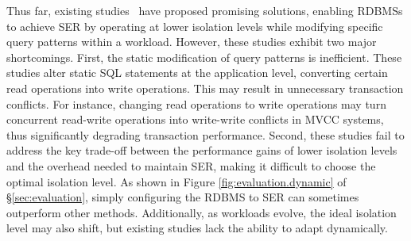 
Thus far, existing studies~\cite{DBLP:journals/pvldb/BailisFFGHS14, DBLP:conf/pods/Fekete19, DBLP:conf/sigmod/BailisFHGS14, DBLP:journals/pvldb/FeketeGA09, DBLP:journals/tods/CahillRF09}  
have proposed promising solutions, enabling RDBMSs to achieve SER by operating at lower isolation levels while modifying specific query patterns within a workload. However, these studies exhibit two major shortcomings. 
First, the static modification of query patterns is inefficient.
These studies alter static SQL statements at the application level, converting certain read operations into write operations. This may result in unnecessary transaction conflicts. For instance, changing read operations to write operations may turn concurrent read-write operations into write-write conflicts in MVCC systems, thus significantly degrading transaction performance.
Second, these studies fail to address the key trade-off between the performance gains of lower isolation levels and the overhead needed to maintain SER, making it difficult to choose the optimal isolation level.
As shown in Figure \ref{fig:evaluation.dynamic} of \S\ref{sec:evaluation}, simply configuring the RDBMS to SER can sometimes outperform other methods. Additionally, as workloads evolve, the ideal isolation level may also shift, but existing studies lack the ability to adapt dynamically. 



